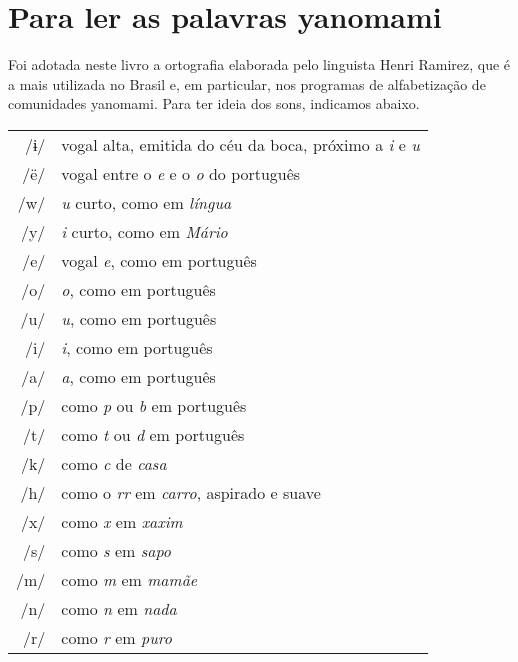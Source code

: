 \chapter{Para ler as palavras yanomami}


Foi adotada neste livro a ortografia elaborada pelo linguista Henri Ramirez, que é a mais utilizada no Brasil e, em particular, nos programas de alfabetização de comunidades yanomami. Para ter ideia dos sons, indicamos abaixo.

\bigskip

\begingroup%
\begin{tabular}{rl}
/ɨ/ & vogal alta, emitida do céu da boca, próximo a \textit{i} e \textit{u}\\
/ë/ & vogal entre o \textit{e} e o \textit{o} do português\\
/w/ & \textit{u} curto, como em \textit{língua}\\
/y/ & \textit{i} curto, como em \textit{Mário}\\
/e/ & vogal \textit{e}, como em português\\
/o/ & \textit{o}, como em português\\
/u/ & \textit{u}, como em português\\
/i/ & \textit{i}, como em português\\
/a/ & \textit{a}, como em português\\
/p/ & como \textit{p} ou \textit{b} em português\\
/t/ & como \textit{t} ou \textit{d} em português\\
/k/ & como \textit{c} de \textit{casa}\\
/h/ & como o \textit{rr} em \textit{carro}, aspirado e suave\\
/x/ & como \textit{x} em \textit{xaxim}\\
/s/ & como \textit{s} em \textit{sapo}\\
/m/ & como \textit{m} em \textit{mamãe}\\
/n/ & como \textit{n} em \textit{nada}\\
/r/ & como \textit{r} em \textit{puro}\\
\end{tabular}
\endgroup